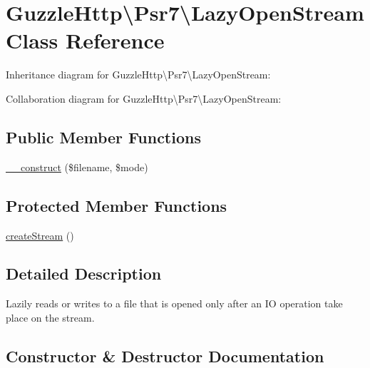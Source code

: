 \hypertarget{classGuzzleHttp_1_1Psr7_1_1LazyOpenStream}{}\section{Guzzle\+Http\textbackslash{}Psr7\textbackslash{}Lazy\+Open\+Stream Class Reference}
\label{classGuzzleHttp_1_1Psr7_1_1LazyOpenStream}


Inheritance diagram for Guzzle\+Http\textbackslash{}Psr7\textbackslash{}Lazy\+Open\+Stream\+:


Collaboration diagram for Guzzle\+Http\textbackslash{}Psr7\textbackslash{}Lazy\+Open\+Stream\+:
\subsection*{Public Member Functions}
\begin{DoxyCompactItemize}
\item 
\hyperlink{classGuzzleHttp_1_1Psr7_1_1LazyOpenStream_aa121d45e7b4b0b48ff7acd4aba871ab5}{\+\_\+\+\_\+construct} (\$filename, \$mode)
\end{DoxyCompactItemize}
\subsection*{Protected Member Functions}
\begin{DoxyCompactItemize}
\item 
\hyperlink{classGuzzleHttp_1_1Psr7_1_1LazyOpenStream_af46e3539119fb0da40a86b61f5facd2c}{create\+Stream} ()
\end{DoxyCompactItemize}


\subsection{Detailed Description}
Lazily reads or writes to a file that is opened only after an IO operation take place on the stream. 

\subsection{Constructor \& Destructor Documentation}
\mbox{\label{classGuzzleHttp_1_1Psr7_1_1LazyOpenStream_aa121d45e7b4b0b48ff7acd4aba871ab5}} 
